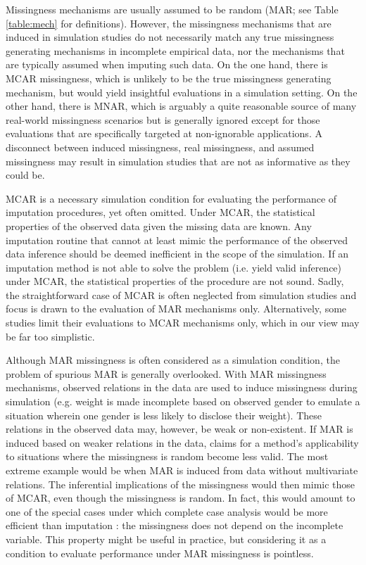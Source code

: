 \documentclass[bimj,fleqn]{w-art}
\begin{document}
Missingness mechanisms are usually assumed to be random (MAR; see Table \ref{table:mech} for definitions). However, the missingness mechanisms that are induced in simulation studies do not necessarily match any true missingness generating mechanisms in incomplete empirical data, nor the mechanisms that are typically assumed when imputing such data. On the one hand, there is MCAR missingness, which is unlikely to be the true missingness generating mechanism, but would yield insightful evaluations in a simulation setting. On the other hand, there is MNAR, which is arguably a quite reasonable source of many real-world missingness scenarios but is generally ignored except for those evaluations that are specifically targeted at non-ignorable applications. A disconnect between induced missingness, real missingness, and assumed missingness may result in simulation studies that are not as informative as they could be. 

MCAR is a necessary simulation condition for evaluating the performance of imputation procedures, yet often omitted. Under MCAR, the statistical properties of the observed data given the missing data are known. Any imputation routine that cannot at least mimic the performance of the observed data inference should be deemed inefficient in the scope of the simulation. If an imputation method is not able to solve the problem (i.e. yield valid inference) under MCAR, the statistical properties of the procedure are not sound. Sadly, the straightforward case of MCAR is often neglected from simulation studies and focus is drawn to the evaluation of MAR mechanisms only. Alternatively, some studies limit their evaluations to MCAR mechanisms only, which in our view may be far too simplistic. 

Although MAR missingness is often considered as a simulation condition, the problem of spurious MAR is generally overlooked. With MAR missingness mechanisms, observed relations in the data are used to induce missingness during simulation (e.g. weight is made incomplete based on observed gender to emulate a situation wherein one gender is less likely to disclose their weight). These relations in the observed data may, however, be weak or non-existent. If MAR is induced based on weaker relations in the data, claims for a method's applicability to situations where the missingness is random become less valid. The most extreme example would be when MAR is induced from data without multivariate relations. The inferential implications of the missingness would then mimic those of MCAR, even though the missingness is random. In fact, this would amount to one of the special cases under which complete case analysis would be more efficient than imputation \citep[see e.g.][\S 2.7]{buur18}: the missingness does not depend on the incomplete variable. This property might be useful in practice, but considering it as a condition to evaluate performance under MAR missingness is pointless. 
\end{document}
